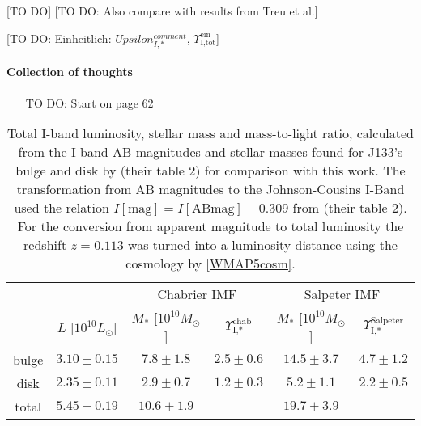 [TO DO] [TO DO: Also compare with results from Treu et al.]

[TO DO: Einheitlich: $Upsilon_{I,*}^{comment}$, $\Upsilon_\text{I,tot}^\text{ein}$]

\paragraph{Collection of thoughts}
\begin{itemize}
\item [TO DO: Start on page 62]
\end{itemize}

\begin{table}
\centering
\begin{tabular}{cccccc}
\hline\hline
& & \multicolumn{2}{c}{Chabrier IMF} & \multicolumn{2}{c}{Salpeter IMF}\\
      &  $L$ [$10^{10}L_{\odot}$]                & $M_*$ [$10^{10}M_\odot$]               & $\Upsilon_\text{I,*}^\text{chab}$ & $M_*$ [$10^{10}M_\odot$] & $\Upsilon_\text{I,*}^\text{Salpeter}$ \\\hline
bulge &   $3.10 \pm 0.15 $  & $7.8 \pm 1.8$ & $2.5 \pm 0.6$ & $14.5 \pm 3.7 $ & $4.7 \pm 1.2$ \\
disk  &   $2.35 \pm 0.11 $  & $2.9 \pm 0.7$ & $1.2 \pm 0.3$ & $5.2 \pm 1.1$ & $2.2 \pm 0.5$ \\
total &   $5.45 \pm 0.19$ & $10.6 \pm 1.9$& & $19.7 \pm 3.9$&\\\hline
\end{tabular}
\caption{Total I-band luminosity, stellar mass and mass-to-light ratio, calculated from the I-band AB magnitudes and stellar masses found for J133's bulge and disk by \citet{SWELLS} (their table 2) for comparison with this work. The transformation from AB magnitudes to the Johnson-Cousins I-Band used the relation $I[\text{mag}] = I[\text{ABmag}] - 0.309$ from \citet{FG1994} (their table 2). For the conversion from apparent magnitude to total luminosity the redshift $z=0.113$ \citet{SWELLSIII} was turned into a luminosity distance using the cosmology by \ref{WMAP5cosm}. }
\label{tab:previousresults}
\end{table}